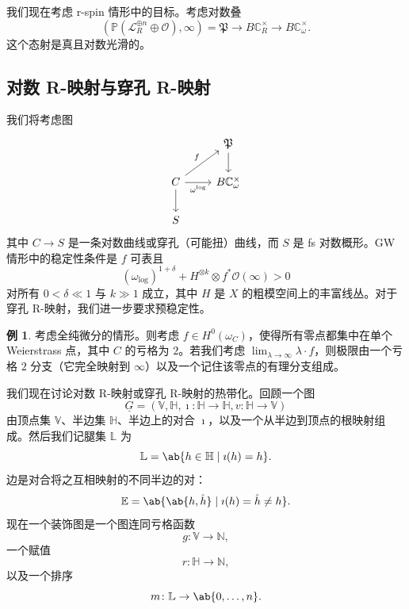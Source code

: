 \documentclass{amsart}
\theoremstyle{definition}
\newtheorem{exm}[thm]{例}
\theoremstyle{remark}
\theoremstyle{plain}
\theoremstyle{definition}
\theoremstyle{remark}
\newcommand{\N}{\mathbb{N}}
\newcommand{\C}{\mathbb{C}}
\newcommand{\E}{\mathbb{E}}
\newcommand{\V}{\mathbb{V}}
\renewcommand{\H}{\mathbb{H}}
\renewcommand{\L}{\mathbb{L}}
\renewcommand{\P}{\mathbb{P}}
\newcommand{\mc}[1]{\mathcal{#1}}
\newcommand{\mf}[1]{\mathfrak{#1}}
\newcommand{\ul}[1]{\underline{#1}}
\newcommand{\1}{\mathbf{1}}
\newcommand{\2}{\mathbf{2}}
\newcommand{\3}{\mathbf{3}}
\begin{document}
我们现在考虑 r-spin 情形中的目标。考虑对数叠
\[ (\P(\mc{L}_R^{\oplus n} \oplus \mc{O}), \infty) = \mf{P} \to B \C_R^{\times} \to B \C_{\omega}^{\times}. \]
这个态射是真且对数光滑的。

\subsection{对数 R-映射与穿孔 R-映射}%
\label{sub:Log and punctured R-maps}

我们将考虑图
\begin{equation*}
\begin{tikzcd}
    & \mf{P} \ar{d} \\
    C \ar{ur}{f} \ar{r}[swap]{\omega^{\log}} \ar{d} & B \C_{\omega}^{\times} \\
    S
\end{tikzcd}
\end{equation*}
其中 \(C \to S\) 是一条对数曲线或穿孔（可能扭）曲线，而 \(S\) 是 fs 对数概形。GW 情形中的稳定性条件是 \(f\) 可表且
\[ (\omega_{\log})^{1+\delta} + H^{\otimes k} \otimes f^* \mc{O}(\infty) > 0 \]
对所有 \(0 < \delta \ll 1\) 与 \(k \gg 1\) 成立，其中 \(H\) 是 \(X\) 的粗模空间上的丰富线丛。对于穿孔 R-映射，我们进一步要求预稳定性。

\begin{exm}
    考虑全纯微分的情形。则考虑 \(f \in H^0(\omega_C)\)，使得所有零点都集中在单个 Weierstrass 点，其中 \(C\) 的亏格为 \(2\)。若我们考虑 \(\lim_{\lambda \to \infty} \lambda \cdot f\)，则极限由一个亏格 \(2\) 分支（它完全映射到 \(\infty\)）以及一个记住该零点的有理分支组成。
\end{exm}

我们现在讨论对数 R-映射或穿孔 R-映射的热带化。回顾一个图
\[ \ul{G} = (\V, \H, \imath \colon \H \to \H, v \colon \H \to \V) \]
由顶点集 \(\V\)、半边集 \(\H\)、半边上的对合 \(\imath\)，以及一个从半边到顶点的根映射组成。然后我们记腿集 \(\L\) 为
\[ \L = \ab\{ h \in \H \mid \imath(h) = h\}. \]
边是对合将之互相映射的不同半边的对：
\[ \E = \ab\{ \ab\{h, \hat{h}\} \mid \imath(h) = \hat{h} \neq h \}. \]
现在一个装饰图是一个图连同亏格函数
\[ g \colon \V \to \N, \]
一个赋值
\[ r \colon \H \to \N, \]
以及一个排序
\[ m \colon \L \to \ab\{0, \ldots, n\}. \]
\end{document}

